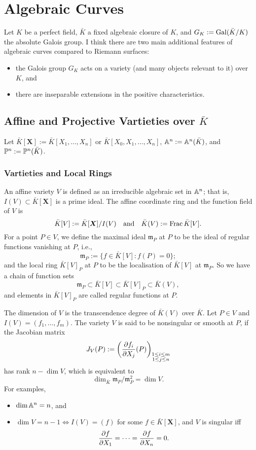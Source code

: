 \section{Algebraic Curves}
Let $K$ be a perfect field, $\bar{K}$ a fixed algebraic closure of $K$, and $G_K := \gal(\bar{K}/K)$ the absolute Galois group.
I think there are two main additional features of algebraic curves compared to Riemann surfaces:\begin{itemize}
    \item the Galois group $G_K$ acts on a variety (and many objects relevant to it) over $K$, and
    \item there are inseparable extensions in the positive characteristics.
\end{itemize}

\subsection{Affine and Projective Vartieties over $\bar{K}$}

Let $\bar{K}[\boldsymbol{X}] := \bar{K}[X_1, \dots, X_n]$ or $\bar{K}[X_0, X_1, \dots, X_n]$, $\A^n := \A^n(\bar K)$, and $\P^n:=\P^n(\bar{K})$.

\subsubsection{Vartieties and Local Rings}
An affine variety $V$ is defined as an irreducible algebraic set in $\A^n$; that is, $I(V)\subset \bar{K}[\boldsymbol{X}]$ is a prime ideal.
The affine coordinate ring and the function field of $V$ is \[\bar{K}[V] := \bar{K}[\boldsymbol{X}]/I(V) \myand \bar{K}(V) := \Frac \bar{K}[V].\]
For a point $P\in V$, we define the maximal ideal $\mathfrak{m}_P$ at $P$ to be the ideal of regular functions vanishing at $P$, i.e.,\[\mathfrak{m}_P := \{f\in \bar{K}[V] : f(P) = 0\};\]
and the local ring $\bar{K}[V]_P$ at $P$ to be the localisation of $\bar{K}[V]$ at $\mathfrak{m}_P$.
So we have a chain of function sets \[\mathfrak{m}_P \subset \bar{K}[V] \subset \bar{K}[V]_P \subset \bar{K}(V), \]
and elements in $\bar{K}[V]_P$ are called regular functions at $P$.

The dimension of $V$ is the transcendence degree of $\bar{K}(V)$ over $\bar{K}$. 
Let $P\in V$ and $I(V) = (f_1, \dots, f_m)$. The variety $V$ is said to be nonsingular or smooth at $P$, if the Jacobian matrix \[J_V(P) := \left( \pdfrac{f_i}{X_j}(P) \right)_{\substack{1\le i\le m \\ 1\le j\le n}}\] has rank $n - \dim V$, which is equivalent to \[\dim_{\bar{K}}\mathfrak{m}_P/\mathfrak{m}_P^2 = \dim V.\]
For examples, 
\begin{itemize}
    \item $\dim\A^n = n$, and
    \item $\dim V = n - 1 \iff I(V) = (f)$ for some $f\in \bar{K}[\boldsymbol{X}]$, and $V$ is singular iff \[\pdfrac{f}{X_1} = \dots = \pdfrac{f}{X_n} = 0.\]
\end{itemize}

